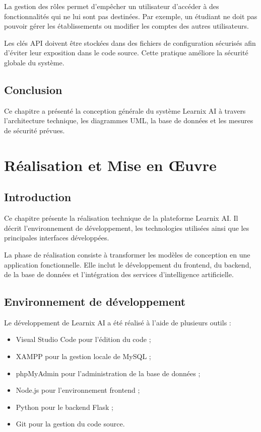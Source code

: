\documentclass[12pt,a4paper]{report}
\begin{document}
La gestion des rôles permet d'empêcher un utilisateur d'accéder à des
fonctionnalités qui ne lui sont pas destinées. Par exemple, un étudiant ne doit
pas pouvoir gérer les établissements ou modifier les comptes des autres
utilisateurs.

Les clés API doivent être stockées dans des fichiers de configuration sécurisés
afin d'éviter leur exposition dans le code source. Cette pratique améliore la
sécurité globale du système.

\section{Conclusion}

Ce chapitre a présenté la conception générale du système Learnix AI à travers
l'architecture technique, les diagrammes UML, la base de données et les mesures
de sécurité prévues.


\chapter{Réalisation et Mise en Œuvre}

\section{Introduction}

Ce chapitre présente la réalisation technique de la plateforme Learnix AI. Il
décrit l'environnement de développement, les technologies utilisées ainsi que les
principales interfaces développées.

La phase de réalisation consiste à transformer les modèles de conception en une
application fonctionnelle. Elle inclut le développement du frontend, du backend,
de la base de données et l'intégration des services d'intelligence artificielle.

\section{Environnement de développement}

Le développement de Learnix AI a été réalisé à l'aide de plusieurs outils :

\begin{itemize}
    \item Visual Studio Code pour l'édition du code ;
    \item XAMPP pour la gestion locale de MySQL ;
    \item phpMyAdmin pour l'administration de la base de données ;
    \item Node.js pour l'environnement frontend ;
    \item Python pour le backend Flask ;
    \item Git pour la gestion du code source.
\end{itemize}
\end{document}
